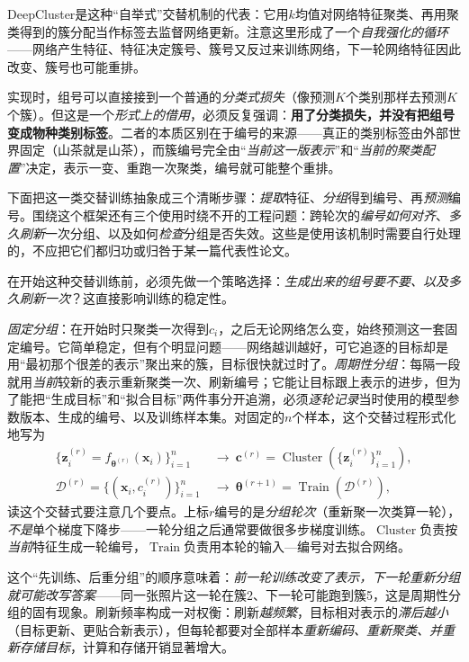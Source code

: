 DeepCluster是这种“自举式”交替机制的代表：它用$k$均值对网络特征聚类、再用聚类得到的簇分配当作标签去监督网络更新。注意这里形成了一个\emph{自我强化的循环}——网络产生特征、特征决定簇号、簇号又反过来训练网络，下一轮网络特征因此改变、簇号也可能重排。

实现时，组号可以直接接到一个普通的\emph{分类式损失}（像预测$K$个类别那样去预测$K$个簇）。但这是一个\emph{形式上的借用}，必须反复强调：\textbf{用了分类损失，并没有把组号变成物种类别标签}。二者的本质区别在于编号的来源——真正的类别标签由外部世界固定（山茶就是山茶），而簇编号完全由“\emph{当前这一版表示}”和“\emph{当前的聚类配置}”决定，表示一变、重跑一次聚类，编号就可能整个重排。

下面把这一类交替训练抽象成三个清晰步骤：\emph{提取}特征、\emph{分组}得到编号、再\emph{预测}编号。围绕这个框架还有三个使用时绕不开的工程问题：跨轮次的\emph{编号如何对齐}、\emph{多久刷新}一次分组、以及如何\emph{检查}分组是否失效。这些是使用该机制时需要自行处理的，不应把它们都归功或归咎于某一篇代表性论文。

在开始这种交替训练前，必须先做一个策略选择：\emph{生成出来的组号要不要、以及多久刷新一次}？这直接影响训练的稳定性。

\emph{固定分组}：在开始时只聚类一次得到$c_i$，之后无论网络怎么变，始终预测这一套固定编号。它简单稳定，但有个明显问题——网络越训越好，可它追逐的目标却是用“最初那个很差的表示”聚出来的簇，目标很快就过时了。\emph{周期性分组}：每隔一段就用\emph{当前}较新的表示重新聚类一次、刷新编号；它能让目标跟上表示的进步，但为了能把“生成目标”和“拟合目标”两件事分开追溯，必须\emph{逐轮记录}当时使用的模型参数版本、生成的编号、以及训练样本集。对固定的$n$个样本，这个交替过程形式化地写为
\[
  \begin{aligned}
    \{\bm{z}_i^{(r)}=f_{\bm{\theta}^{(r)}}(\bm{x}_i)\}_{i=1}^{n}
    &\ \longrightarrow\
    \bm{c}^{(r)}
    =\operatorname{Cluster}(\{\bm{z}_i^{(r)}\}_{i=1}^{n}),\\
    \mathcal{D}^{(r)}=\{(\bm{x}_i,c_i^{(r)})\}_{i=1}^{n}
    &\ \longrightarrow\
    \bm{\theta}^{(r+1)}=\operatorname{Train}(\mathcal{D}^{(r)}),
  \end{aligned}
\]
读这个交替式要注意几个要点。上标$r$编号的是\emph{分组轮次}（重新聚一次类算一轮），\emph{不是}单个梯度下降步——一轮分组之后通常要做很多步梯度训练。$\operatorname{Cluster}$负责按\emph{当前}特征生成一轮编号，$\operatorname{Train}$负责用本轮的输入—编号对去拟合网络。

这个“先训练、后重分组”的顺序意味着：\emph{前一轮训练改变了表示，下一轮重新分组就可能改写答案}——同一张照片这一轮在簇2、下一轮可能跑到簇5，这是周期性分组的固有现象。刷新频率构成一对权衡：刷新\emph{越频繁}，目标相对表示的\emph{滞后越小}（目标更新、更贴合新表示），但每轮都要对全部样本\emph{重新编码、重新聚类、并重新存储目标}，计算和存储开销显著增大。

